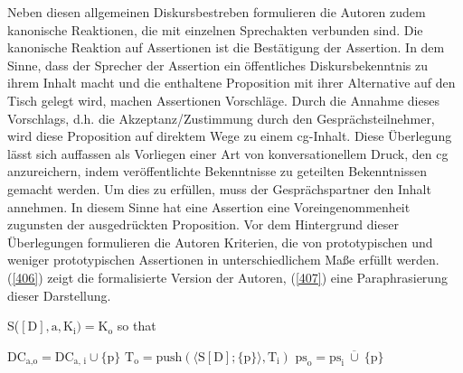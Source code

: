 Neben diesen allgemeinen Diskursbestreben formulieren die Autoren zudem kanoni\-sche Reaktionen, die mit einzelnen Sprechakten verbunden sind. Die kanonische Reaktion auf Assertionen ist die Bestätigung der Assertion. In dem Sinne, dass der Sprecher der Assertion ein öffentliches Diskursbekenntnis zu ihrem Inhalt macht und die enthaltene Proposition mit ihrer Alternative auf den Tisch gelegt wird, machen Assertionen Vorschläge. Durch die Annahme dieses Vor\-schlags, d.h. die Akzeptanz/Zustimmung durch den Gesprächsteilnehmer, wird diese Proposition auf direktem Wege zu einem cg-Inhalt. Diese Überlegung lässt sich auffassen als Vorliegen einer Art von konversationellem Druck, den cg anzurei\-chern, indem veröffentlichte Bekenntnisse zu geteilten Bekenntnissen gemacht werden. Um dies zu erfüllen, muss der Gesprächspartner den Inhalt annehmen. In diesem Sinne hat eine Assertion eine Voreingenommenheit zugunsten der ausgedrückten Proposition. Vor dem Hintergrund dieser Überlegungen formulieren die Autoren Kriterien, die von prototypischen und weniger prototypischen Assertionen  in unterschiedlichem Maße erfüllt werden. (\ref{406}) zeigt die formalisierte Version der Autoren, (\ref{407}) eine Paraphrasierung dieser Darstellung.

\begin{exe}
	\ex\label{406} 
		S($[\textrm{D}], \textrm{a}, \textrm{K}_{\textrm{i}}) = \textrm{K}_{\textrm{o}}$ so that
		\begin{xlist}	
			\ex\label{406a} $\textrm{DC}_{\textrm{a,o}} = \textrm{DC}_{\textrm{a, i}} \cup \lbrace\textrm{p}\rbrace$
			\ex\label{406b} $\textrm{T}_{\textrm{o}} = \textrm{push}(\langle \textrm{S}[\textrm{D}]; \lbrace \textrm{p} \rbrace \rangle, \textrm{T}_{\textrm{i}})$
			\ex\label{406c} $\textrm{ps}_{\textrm{o}} =  \textrm{ps}_{\textrm{i}} \ \overline\cup \ \lbrace \textrm{p} \rbrace$
			\hfill\hbox {\citet[92]{Farkas2010}}
		\end{xlist}
\end{exe}

